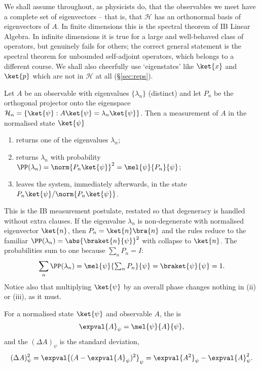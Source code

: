 We shall assume throughout, as physicists do, that the observables we meet have a complete set of eigenvectors -- that is, that $\mathcal{H}$ has an orthonormal basis of eigenvectors of $A$. In finite dimensions this is the spectral theorem of IB Linear Algebra. In infinite dimensions it is true for a large and well-behaved class of operators, but genuinely fails for others; the correct general statement is the spectral theorem for unbounded self-adjoint operators, which belongs to a different course. We shall also cheerfully use `eigenstates' like $\ket{x}$ and $\ket{p}$ which are not in $\mathcal{H}$ at all (\S\ref{sec:reps}).

\begin{axiom}[Measurement]
    Let $A$ be an observable with eigenvalues $\{\lambda_n\}$ (distinct) and let $P_n$ be the orthogonal projector onto the eigenspace $\mathcal{H}_n = \{\ket{\psi} : A\ket{\psi} = \lambda_n \ket{\psi}\}$. Then a measurement of $A$ in the normalised state $\ket{\psi}$
    \begin{enumerate}[label=(\roman*)]
        \item returns one of the eigenvalues $\lambda_n$;
        \item returns $\lambda_n$ with probability $\PP(\lambda_n) = \norm{P_n \ket{\psi}}^2 = \mel{\psi}{P_n}{\psi}$;
        \item leaves the system, immediately afterwards, in the state $P_n\ket{\psi} / \norm{P_n\ket{\psi}}$.
    \end{enumerate}
\end{axiom}

This is the IB measurement postulate, restated so that degeneracy is handled without extra clauses. If the eigenvalue $\lambda_n$ is non-degenerate with normalised eigenvector $\ket{n}$, then $P_n = \ket{n}\bra{n}$ and the rules reduce to the familiar $\PP(\lambda_n) = \abs{\braket{n}{\psi}}^2$ with collapse to $\ket{n}$. The probabilities sum to one because $\sum_n P_n = I$:
$$
\sum_n \PP(\lambda_n) = \mel{\psi}{\textstyle\sum_n P_n}{\psi} = \braket{\psi}{\psi} = 1.
$$
Notice also that multiplying $\ket{\psi}$ by an overall phase changes nothing in (ii) or (iii), as it must.

\begin{definition}
    For a normalised state $\ket{\psi}$ and observable $A$, the  is
    $$
    \expval{A}_\psi = \mel{\psi}{A}{\psi},
    $$
    and the  $(\Delta A)_\psi$ is the standard deviation,
    $$
    (\Delta A)_\psi^2 = \expval{(A - \expval{A}_\psi)^2}_\psi = \expval{A^2}_\psi - \expval{A}_\psi^2.
    $$
\end{definition}

